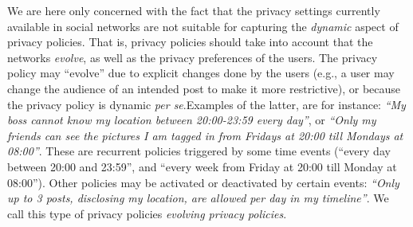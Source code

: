 
We are here only concerned with the fact that the privacy settings currently available in social networks are not suitable for capturing the {\em dynamic} aspect of privacy policies. That is, privacy policies should take into account that the networks {\it evolve}, as well as the privacy preferences of the users. The privacy policy may ``evolve'' due to explicit changes done by the users (e.g., a user may change the audience of an intended post to make it more restrictive), or because the privacy policy is dynamic {\it per se}.Examples of the latter, are for instance: {\it ``My boss cannot know my location between 20:00-23:59 every day''}, or {\it ``Only my friends can see the pictures I am tagged in from Fridays at 20:00 till Mondays at 08:00''}. These are recurrent policies triggered by some time events (``every day between 20:00 and 23:59'', and ``every week from Friday at 20:00 till Monday at 08:00''). Other policies may be activated or deactivated by certain events: {\it ``Only up to 3 posts, disclosing my location, are allowed per day in my timeline''}. We call this type of privacy policies {\em evolving privacy policies}.

